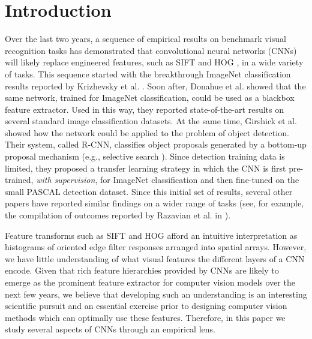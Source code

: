 \section{Introduction}

Over the last two years, a sequence of empirical results on benchmark visual recognition tasks has demonstrated that convolutional neural networks (CNNs) \cite{fukushima1980neocognitron,Lecun89,rumelhart86} will likely replace engineered features, such as SIFT \cite{Sift} and HOG \cite{Hog}, in a wide variety of tasks.
This sequence started with the breakthrough ImageNet classification results reported by Krizhevsky et al. \cite{Kriz}.
Soon after, Donahue et al. \cite{Decaf} showed that the same network, trained for ImageNet classification, could be used as a blackbox feature extractor.
Used in this way, they reported state-of-the-art results on several standard image classification datasets.
At the same time, Girshick et al. \cite{Rcnn} showed how the network could be applied to the problem of object detection.
Their system, called R-CNN, classifies object proposals generated by a bottom-up proposal mechanism (e.g., selective search \cite{UijlingsIJCV2013}).
Since detection training data is limited, they proposed a transfer learning strategy in which the CNN is first pre-trained, \emph{with supervision}, for ImageNet classification and then fine-tuned on the small PASCAL detection dataset.
Since this initial set of results, several other papers have reported similar findings on a wider range of tasks (see, for example, the compilation of outcomes reported by Razavian et al. in \cite{astounding}).

Feature transforms such as SIFT and HOG afford an intuitive interpretation as histograms of oriented edge filter responses arranged into spatial arrays.
However, we have little understanding of what visual features the different layers of a CNN encode.
Given that rich feature hierarchies provided by CNNs are likely to emerge as the prominent feature extractor for computer vision models over the next few years, we believe that developing such an understanding is an interesting scientific pursuit and an essential exercise prior to designing computer vision methods which can optimally use these features.
Therefore, in this paper we study several aspects of CNNs through an empirical lens.

